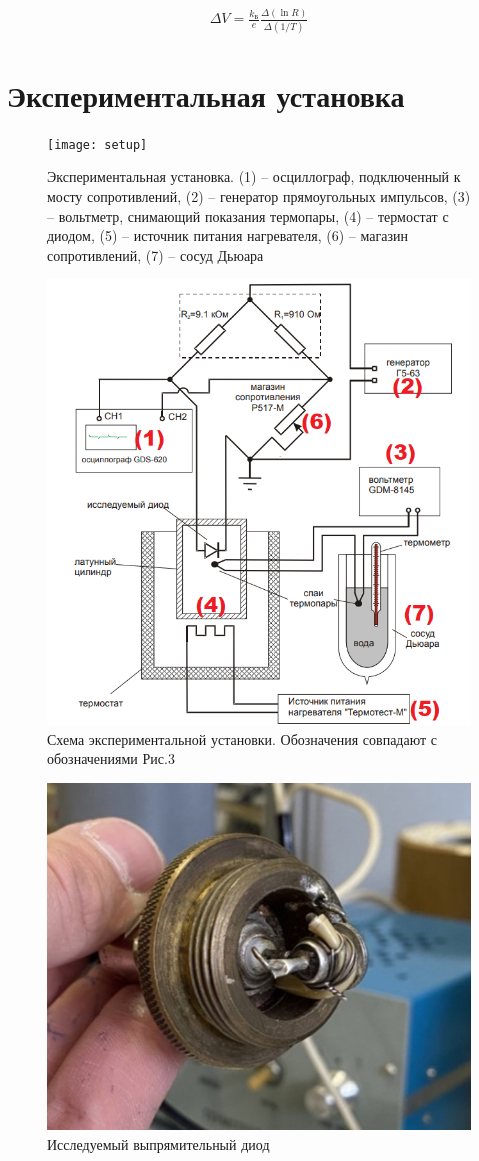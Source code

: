 \documentclass[a4paper,12pt]{article}
\begin{document}
\begin{align}
	\label{eq1:delta_v}
	\Delta V = \frac{k_Б}{e} \frac{\Delta(\ln R)}{\Delta(1/T)}
\end{align}

\section*{Экспериментальная установка}

\begin{figure}[h!]
	\centering
	\texttt{[image: setup]}
	\caption{Экспериментальная установка. (1) -- осциллограф, подключенный к мосту сопротивлений, (2) -- генератор прямоугольных импульсов, (3) -- вольтметр, снимающий показания термопары, (4) -- термостат с диодом, (5) -- источник питания нагревателя, (6) -- магазин сопротивлений, (7) -- сосуд Дьюара}
\end{figure}

\begin{figure}[h!]
	\centering
	\includegraphics[width=0.7\linewidth]{scheme}
	\caption{Схема экспериментальной установки. Обозначения совпадают с обозначениями Рис.3}
\end{figure}

\newpage

\begin{figure}[h!]
	\centering
	\includegraphics[width=0.7\linewidth]{diod}
	\caption{Исследуемый выпрямительный диод}
\end{figure}
\end{document}
